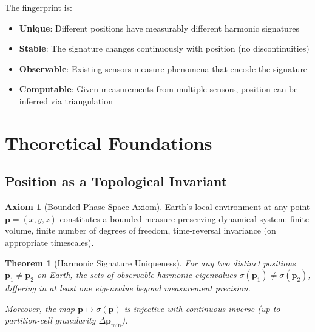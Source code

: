 \documentclass[11pt,twocolumn,a4paper]{article}
\newtheorem{theorem}{Theorem}[section]
\theoremstyle{definition}
\newtheorem{axiom}{Axiom}
\begin{document}
The fingerprint is:
\begin{itemize}[nosep]
\item \textbf{Unique}: Different positions have measurably different harmonic signatures
\item \textbf{Stable}: The signature changes continuously with position (no discontinuities)
\item \textbf{Observable}: Existing sensors measure phenomena that encode the signature
\item \textbf{Computable}: Given measurements from multiple sensors, position can be inferred via triangulation
\end{itemize}

\section{Theoretical Foundations}
\label{sec:foundations}

\subsection{Position as a Topological Invariant}

\begin{axiom}[Bounded Phase Space Axiom]
Earth's local environment at any point $\mathbf{p} = (x, y, z)$ constitutes a bounded measure-preserving dynamical system: finite volume, finite number of degrees of freedom, time-reversal invariance (on appropriate timescales).
\end{axiom}

\begin{theorem}[Harmonic Signature Uniqueness]
\label{thm:uniqueness}
For any two distinct positions $\mathbf{p}_1 \neq \mathbf{p}_2$ on Earth, the sets of observable harmonic eigenvalues $\sigma(\mathbf{p}_1) \neq \sigma(\mathbf{p}_2)$, differing in at least one eigenvalue beyond measurement precision.

Moreover, the map $\mathbf{p} \mapsto \sigma(\mathbf{p})$ is injective with continuous inverse (up to partition-cell granularity $\Delta \mathbf{p}_{\min}$).
\end{theorem}
\end{document}
